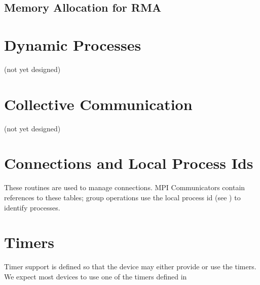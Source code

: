 \documentclass{article}
\begin{document}
\subsection{Memory Allocation for RMA}




\section{Dynamic Processes}
(not yet designed)

\section{Collective Communication}
(not yet designed)

\section{Connections and Local Process Ids}
\label{sec:connections}
These routines are used to manage connections.  MPI Communicators contain
references to these tables; group operations use the local process id
(see ) to identify processes.








%
%

%
%
%

\section{Timers}
Timer support is defined so that the device may either provide or use
the timers.  We expect most devices to use one of the timers defined
in 






\end{document}
